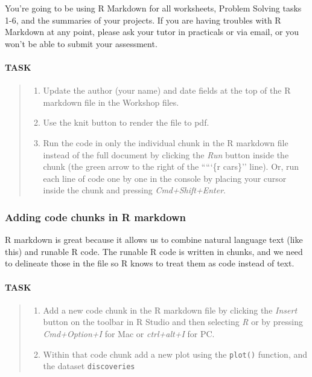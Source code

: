 \documentclass[]{article}
\providecommand{\tightlist}{%
  \setlength{\itemsep}{0pt}\setlength{\parskip}{0pt}}
\let\oldparagraph\paragraph
\renewcommand{\paragraph}[1]{\oldparagraph{#1}\mbox{}}
\begin{document}
You're going to be using R Markdown for all worksheets, Problem Solving
tasks 1-6, and the summaries of your projects. If you are having
troubles with R Markdown at any point, please ask your tutor in
practicals or via email, or you won't be able to submit your assessment.

\hypertarget{task}{%
\paragraph{TASK}\label{task}}

\begin{quote}
\begin{enumerate}
\def\labelenumi{\arabic{enumi}.}
\tightlist
\item
  Update the author (your name) and date fields at the top of the R
  markdown file in the Workshop files.
\item
  Use the knit button to render the file to pdf.\\
\item
  Run the code in only the individual chunk in the R markdown file
  instead of the full document by clicking the \emph{Run} button inside
  the chunk (the green arrow to the right of the `````\{r cars\}''
  line). Or, run each line of code one by one in the console by placing
  your cursor inside the chunk and pressing \emph{Cmd+Shift+Enter}.
\end{enumerate}
\end{quote}

\hypertarget{adding-code-chunks-in-r-markdown}{%
\subsubsection{Adding code chunks in R
markdown}\label{adding-code-chunks-in-r-markdown}}

R markdown is great because it allows us to combine natural language
text (like this) and runable R code. The runable R code is written in
chunks, and we need to delineate those in the file so R knows to treat
them as code instead of text.

\hypertarget{task-1}{%
\paragraph{TASK}\label{task-1}}

\begin{quote}
\begin{enumerate}
\def\labelenumi{\arabic{enumi}.}
\setcounter{enumi}{3}
\tightlist
\item
  Add a new code chunk in the R markdown file by clicking the
  \emph{Insert} button on the toolbar in R Studio and then selecting
  \emph{R} or by pressing \emph{Cmd+Option+I} for Mac or
  \emph{ctrl+alt+I} for PC.
\item
  Within that code chunk add a new plot using the \texttt{plot()}
  function, and the dataset \texttt{discoveries}
\end{enumerate}
\end{quote}
\end{document}
